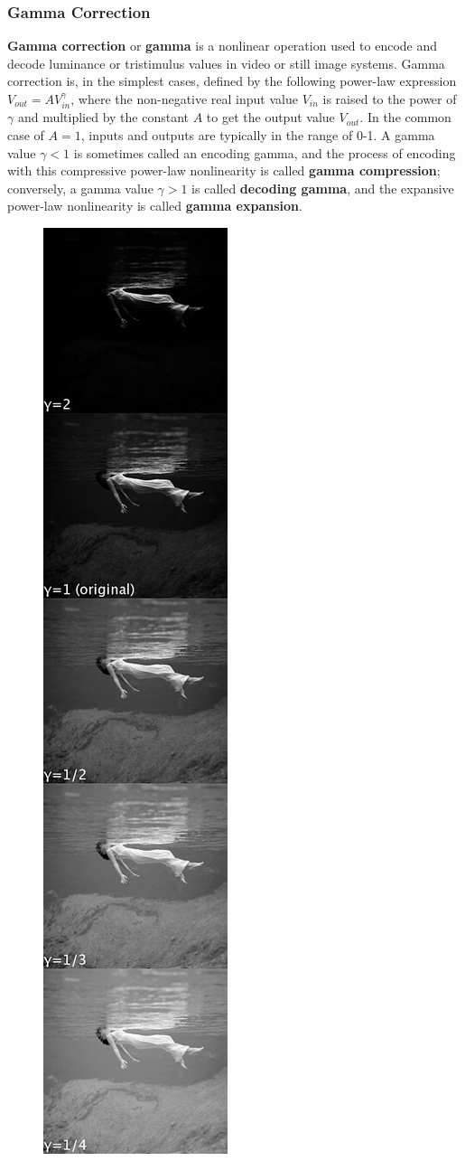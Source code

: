 \documentclass[10pt]{article}
\begin{document}
\begin{multicols}{2}
\subsubsection{Gamma Correction}
\textbf{Gamma correction} or \textbf{gamma} is a nonlinear operation used to encode and decode luminance or tristimulus values in video or still image systems. Gamma correction is, in the simplest cases, defined by the following power-law expression \(V_{out}=AV_{in}^{\gamma}\),
where the non-negative real input value $V_{in}$ is raised to the power of $\gamma$ and multiplied by the constant $A$ to get the output value $V_{out}$. In the common case of $A=1$, inputs and outputs are typically in the range of 0-1.
\newline \newline
A gamma value $\gamma<1$ is sometimes called an encoding gamma, and the process of encoding with this compressive power-law nonlinearity is called \textbf{gamma compression}; conversely, a gamma value $\gamma>1$ is called \textbf{decoding gamma}, and the expansive power-law nonlinearity is called \textbf{gamma expansion}.
\begin{figure}[H]
    \centering
    \includegraphics[width=0.35\linewidth]{Images/Week 3/gamma-ex.jpg}

\end{figure}
\end{multicols}
\end{document}
